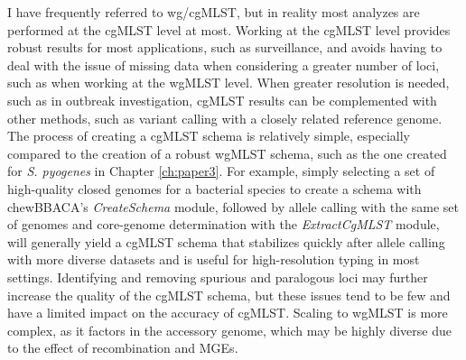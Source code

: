 I have frequently referred to \ac{wg/cgMLST}, but in reality most analyzes are performed at the cgMLST level at most. Working at the cgMLST level provides robust results for most applications, such as surveillance, and avoids having to deal with the issue of missing data when considering a greater number of loci, such as when working at the wgMLST level. When greater resolution is needed, such as in outbreak investigation, cgMLST results can be complemented with other methods, such as variant calling with a closely related reference genome. The process of creating a cgMLST schema is relatively simple, especially compared to the creation of a robust wgMLST schema, such as the one created for \textit{S. pyogenes} in Chapter \ref{ch:paper3}. For example, simply selecting a set of high-quality closed genomes for a bacterial species to create a schema with chewBBACA's \textit{CreateSchema} module, followed by allele calling with the same set of genomes and core-genome determination with the \textit{ExtractCgMLST} module, will generally yield a cgMLST schema that stabilizes quickly after allele calling with more diverse datasets and is useful for high-resolution typing in most settings. Identifying and removing spurious and paralogous loci may further increase the quality of the cgMLST schema, but these issues tend to be few and have a limited impact on the accuracy of cgMLST. Scaling to wgMLST is more complex, as it factors in the accessory genome, which may be highly diverse due to the effect of recombination and \ac{MGEs}.

